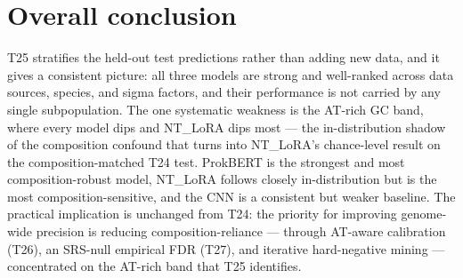 \documentclass{article}
\begin{document}
\section{Overall conclusion}
T25 stratifies the held-out test predictions rather than adding new data, and it gives a consistent picture: all three models are strong and well-ranked across data sources, species, and sigma factors, and their performance is not carried by any single subpopulation. The one systematic weakness is the AT-rich GC band, where every model dips and NT\_LoRA dips most --- the in-distribution shadow of the composition confound that turns into NT\_LoRA's chance-level result on the composition-matched T24 test. ProkBERT is the strongest and most composition-robust model, NT\_LoRA follows closely in-distribution but is the most composition-sensitive, and the CNN is a consistent but weaker baseline. The practical implication is unchanged from T24: the priority for improving genome-wide precision is reducing composition-reliance --- through AT-aware calibration (T26), an SRS-null empirical FDR (T27), and iterative hard-negative mining --- concentrated on the AT-rich band that T25 identifies.
\end{document}

